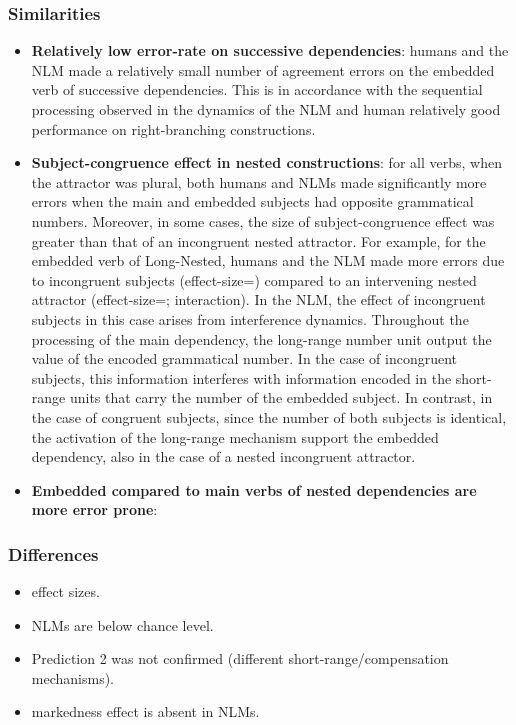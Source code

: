 \subsubsection{Similarities}
\begin{itemize}
    \item \textbf{Relatively low error-rate on successive dependencies}: humans and the NLM made a relatively small number of agreement errors on the embedded verb of successive dependencies. This is in accordance with the sequential processing observed in the dynamics of the NLM and human relatively good performance on right-branching constructions. 
    \item \textbf{Subject-congruence effect in nested constructions}: for all verbs, when the attractor was plural, both humans and NLMs made significantly more errors when the main and embedded subjects had opposite grammatical numbers. Moreover, in some cases, the size of subject-congruence effect was greater than that of an incongruent nested attractor. For example, for the embedded verb of Long-Nested, humans and the NLM made more errors due to incongruent subjects (effect-size=) compared to an intervening nested attractor (effect-size=; interaction). In the NLM, the effect of incongruent subjects in this case arises from interference dynamics. Throughout the processing of the main dependency, the long-range number unit output the value of the encoded grammatical number. In the case of incongruent subjects, this information interferes with information encoded in the short-range units that carry the number of the embedded subject. In contrast, in the case of congruent subjects, since the number of both subjects is identical, the activation of the long-range mechanism support the embedded dependency, also in the case of a nested incongruent attractor.
    \item \textbf{Embedded compared to main verbs of nested dependencies are more error prone}:
    
\end{itemize}

\subsubsection{Differences}
    \begin{itemize}
        \item effect sizes. 
	\item NLMs are below chance level. 
        \item Prediction 2 was not confirmed (different short-range/compensation mechanisms).
        \item markedness effect is absent in NLMs. 
    \end{itemize}
    
